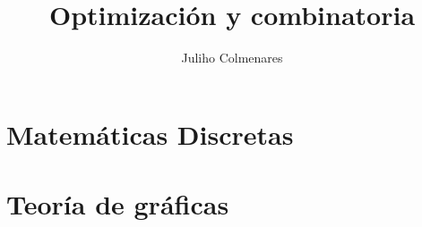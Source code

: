\documentclass[
twoside,
12pt,
letterpaper, 
justified
]{tufte-book}
\title{Optimización y combinatoria}
\author[J. Colmenares]{Juliho Colmenares}
\begin{document}
	\maketitle
	\tableofcontents

\chapter{Matemáticas Discretas}





\chapter{Teoría de gráficas}




{}

\end{document}
